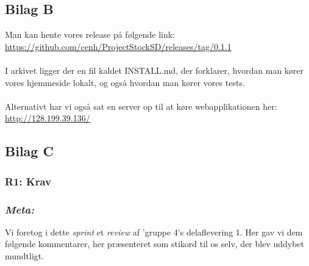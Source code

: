 \documentclass[12pt]{article}
\begin{document}
\subsection{Bilag B}
\label{sec:bilagB}
Man kan hente vores release på følgende link:
\url{https://github.com/cenh/ProjectStockSD/releases/tag/0.1.1}\\
\\
I arkivet ligger der en fil kaldet INSTALL.md, der forklarer, hvordan man kører vores hjemmeside lokalt, og også hvordan man kører vores tests. \\ \\
Alternativt har vi også sat en server op til at køre webapplikationen her: \url{http://128.199.39.136/}

\subsection{Bilag C}
\label{sec:bilagC}
\subsubsection{R1: Krav}

\subsubsection*{\textit{Meta:}}
Vi foretog i dette \textit{sprint} et \textit{review} af 'gruppe 4's delaflevering 1. Her gav vi dem følgende kommentarer, her præsenteret som stikord til os selv, der blev uddybet mundtligt.
\end{document}
